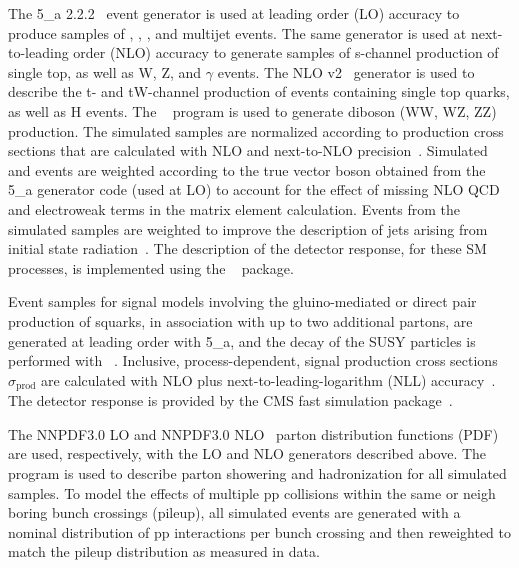 The {\MADGRAPH{}5\_a\MCATNLO} 2.2.2~\cite{Alwall2014} event generator
is used at leading order (LO) accuracy to produce samples of \wj, \zj,
\ttbar, and multijet events. The same generator is used at
next-to-leading order (NLO) accuracy to generate samples of s-channel
production of single top, as well as {\ttbar}W, {\ttbar}Z, and
{\ttbar}$\gamma$ events. The NLO \POWHEG v2~\cite{powheg,
  powheg_top_Wt} generator is used to describe the t- and tW-channel
production of events containing single top quarks, as well as
{\ttbar}H events. The ~\cite{pythia} program is used to
generate diboson (WW, WZ, ZZ) production. The simulated samples are
normalized according to production cross sections that are calculated
with NLO and next-to-NLO precision~\cite{Alwall2014, wphys, fewz,
  wwxs, top++, nlotop, powheg_top_Wt}. Simulated \wj and \zj events
are weighted according to the true vector boson \pt obtained from the
{\MADGRAPH{}5\_a\MCATNLO} generator code (used at LO) to account for
the effect of missing NLO QCD and electroweak terms in the matrix
element calculation. Events from the \ttbar simulated samples are
weighted to improve the description of jets arising from initial state
radiation~\cite{}. The description of the detector response, for these
SM processes, is implemented using the \GEANTfour~\cite{geant}
package.

Event samples for signal models involving the gluino-mediated or
direct pair production of squarks, in association with up to two
additional partons, are generated at leading order with
{\MADGRAPH{}5\_a\MCATNLO}, and the decay of the SUSY particles is
performed with ~\cite{pythia}. Inclusive,
process-dependent, signal production cross sections
$\sigma_\text{prod}$ are calculated with NLO plus
next-to-leading-logarithm (NLL) accuracy~\cite{Beenakker:1996ch,
  PhysRevLett.102.111802, PhysRevD.80.095004, 1126-6708-2009-12-041,
  doi:10.1142/S0217751X11053560, susynlo}. The detector response is
provided by the CMS fast simulation package~\cite{fastsim}.

The \textsc{NNPDF}3.0 LO and \textsc{NNPDF}3.0 NLO~\cite{nnpdf} parton
distribution functions (PDF) are used, respectively, with the LO and
NLO generators described above. The ~\cite{pythia} program
is used to describe parton showering and hadronization for all
simulated samples. To model the effects of multiple pp collisions
within the same or neigh boring bunch crossings (pileup), all simulated
events are generated with a nominal distribution of pp interactions
per bunch crossing and then reweighted to match the pileup
distribution as measured in data.


